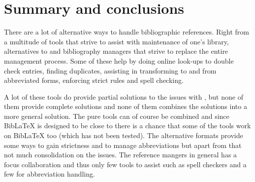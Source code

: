 







\section{Summary and conclusions}
There are a lot of alternative ways to handle
bibliographic references.  Right from a multitude of tools that strive
to assist with maintenance of one's {\bibtex} library, alternatives to
{\bibtex} and bibliography managers that strive to replace the entire
management process.  Some of these help by doing online look-ups to
double check entries, finding duplicates, assisting in transforming to
and from abbreviated forms, enforcing strict rules and spell checking.

A lot of these tools do provide partial solutions to the issues with
{\bibtex}, but none of them provide complete solutions and none of
them combines the solutions into a more general solution.  The pure
{\bibtex} tools can of course be combined and since Bib{\LaTeX} is
designed to be close to {\bibtex} there is a chance that some of the
{\bibtex} tools work on Bib{\LaTeX} too (which has not been tested).  The
alternative formats provide some ways to gain strictness and to manage
abbreviations but apart from that not much consolidation on the
issues.  The reference mangers in general has a focus collaboration
and thus only few tools to assist such as spell checkers and a few for
abbreviation handling.


